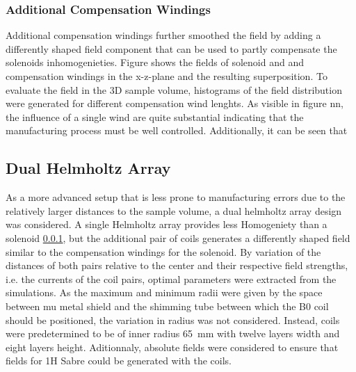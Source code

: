         \subsubsection{Additional Compensation Windings}
            Additional compensation windings further smoothed the field by adding a differently shaped field component that can be used to partly compensate the solenoids inhomogenieties. Figure  shows the fields of solenoid and and compensation windings in the x-z-plane and the resulting superposition.
            To evaluate the field in the 3D sample volume, histograms of the field distribution were generated for different compensation wind lenghts. As visible in figure nn, the influence of a single wind are quite substantial indicating that the manufacturing process must be well controlled. Additionally, it can be seen that

        \subsection{Dual Helmholtz Array}\label{simulations:DualHelmholtzArray}
        As a more advanced setup that is less prone to manufacturing errors due to the relatively larger distances to the sample volume, a dual helmholtz array design was considered. A single Helmholtz array provides less Homogeniety than a solenoid \ref{}, but the additional pair of coils generates a differently shaped field similar to the compensation windings for the solenoid. By variation of the distances of both pairs relative to the center and their respective field strengths, i.e. the currents of the coil pairs, optimal parameters were extracted from the simulations. As the maximum and minimum radii were given by the space between mu metal shield and the shimming tube between which the B0 coil should be positioned, the variation in radius was not considered. Instead, coils were predetermined to be of inner radius \SI{65}{\mm} with twelve layers width and eight layers height.
        Aditionnaly, absolute fields were considered to ensure that fields for 1H Sabre could be generated with the coils.
